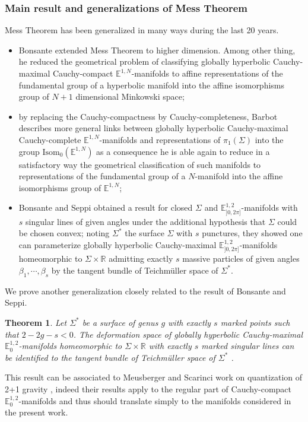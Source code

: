 \documentclass[a4paper,12pt]{article}
\def\isom{Isom}
\def\RR{\mathbb{R}}
\newcommand{\mass}[1]{{\mathbb E}^{1,2}_{#1}}
\def\isom{\mathrm{Isom}}
\newtheorem{theo}{Theorem}    %
\begin{document}
\subsubsection*{Main result and generalizations of Mess Theorem}



Mess Theorem has been generalized in many ways during the last 20 years. 
\begin{itemize}
\item  Bonsante \cite{MR2170277,MR2499272} extended Mess Theorem to higher dimension. Among other thing, he reduced the geometrical problem of classifying globally hyperbolic Cauchy-maximal Cauchy-compact $\mathbb E^{1,N}$-manifolds to affine representations of the fundamental group of a hyperbolic manifold into the affine isomorphisms group of $N+1$ dimensional Minkowski space; 
\item by replacing the Cauchy-compactness by Cauchy-completeness,  Barbot \cite{barbot_globally_2004} describes more general links between globally hyperbolic Cauchy-maximal Cauchy-complete $\mathbb{E}^{1,N}$-manifolds and representations of $\pi_1(\Sigma)$ into the group $\isom_0(\mathbb E^{1,N})$ as a consequence he is able again to reduce in a satisfactory way the geometrical classification of such manifolds to representations of the fundamental group of a $N$-manifold into the affine isomorphisms group of $\mathbb{E}^{1,N}$;

\item  Bonsante and Seppi \cite{MR3493421} obtained a result for closed $\Sigma$
 and $\mass{]0,2\pi]}$-mani\-folds with $s$ singular lines of given angles under the
additional hypothesis that $\Sigma$ could be chosen convex; noting $\Sigma^*$ the surface $\Sigma$ with $s$ punctures, they showed one can parameterize globally
hyperbolic Cauchy-maximal $\mass{]0,2\pi]}$-manifolds homeomorphic to $\Sigma\times \RR$ admitting exactly $s$ massive particles of given angles $\beta_1,\cdots,\beta_s$
by the tangent bundle of Teichmüller space of $\Sigma^*$.  
\end{itemize}  
We prove another generalization closely related to the result of Bonsante and Seppi.
\begin{theo}\label{theo:princ_intro} Let $\Sigma^*$ be a surface of genus $g$ with exactly $s$ marked points such that $2-2g-s<0$. The deformation space of globally hyperbolic Cauchy-maximal $\mass{0}$-manifolds homeomorphic to $\Sigma\times \RR$ with exactly $s$ marked singular lines can be identified to the tangent bundle of Teichmüller space of $\Sigma^*$ .
\end{theo}
This result can be associated to Meusberger and Scarinci work on quantization of 2+1 gravity \cite{MR3523528}, indeed their results apply to the regular part of Cauchy-compact $\mass{0}$-manifolds and thus should translate simply to the manifolds considered in the present work. 
\end{document}
